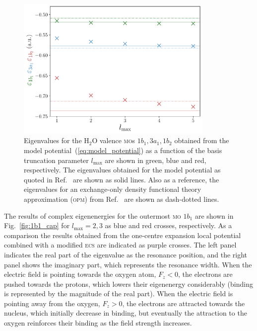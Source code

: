 \begin{figure}
  \centering
  \includegraphics[width=0.85\textwidth]{figures/ch_H2O/partial_wave/eigenvalues_fieldfree.pdf}
  \caption{Eigenvalues for the H$_{2}$O valence \textsc{mo}s
    $1b_{1}, 3a_{1}, 1b_{2}$ obtained from the model
    potential~(\ref{eq:model_potential}) as a function of the basis
    truncation parameter $l_{\mathrm{max}}$ are shown in green, blue
    and red, respectively. The eigenvalues obtained for the model
    potential as quoted in Ref.~\cite{illescas_2015} are shown as
    solid lines. Also as a reference, the eigenvalues for an
    exchange-only density functional theory approximation
    (\textsc{opm}) from Ref.~\cite{opm_2007} are shown as dash-dotted
    lines.}
  \label{fig:energies_fieldfree}
\end{figure}

The results of complex eigenenergies for the outermost \textsc{mo}
$1b_{1}$ are shown in Fig.~\ref{fig:1b1_cap} for $l_{\mathrm{max}} =
2,3$ as blue and red crosses, respectively. As a comparison the
results obtained from the one-centre expansion local potential
combined with a modified \textsc{ecs} are indicated as purple
crosses. The left panel indicates the real part of the eigenvalue as
the resonance position, and the right panel shows the imaginary part,
which represents the resonance width. When the electric field is
pointing towards the oxygen atom, $F_{z} < 0$, the electrons are
pushed towards the protons, which lowers their eigenenergy
considerably (binding is represented by the magnitude of the real
part). When the electric field is pointing away from the oxygen,
$F_{z} > 0$, the electrons are attracted towards the nucleus, which
initially decrease in binding, but eventually the attraction to the
oxygen reinforces their binding as the field strength increases.

